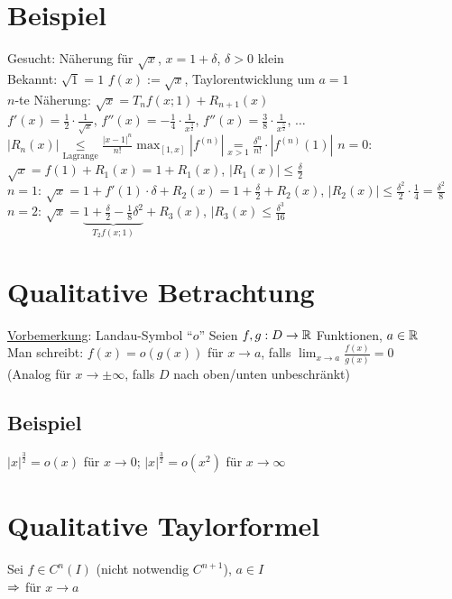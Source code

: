 \section{Beispiel}\label{15.4}
Gesucht: Näherung für $\sqrt{x}$, $x=1+\delta$, $\delta > 0$ klein\\
Bekannt: $\sqrt{1}=1$\nl
$f(x) := \sqrt{x}$, Taylorentwicklung um $a=1$\\
$n$-te Näherung: $\sqrt{x} = T_n f(x; 1) + R_{n+1}(x)$\\
$f'(x) = \frac{1}{2} \cdot \frac{1}{\sqrt{x}}$, $f''(x) = -\frac{1}{4} \cdot \frac{1}{x^{\frac{3}{2}}}$, $f''(x) = \frac{3}{8} \cdot \frac{1}{x^{\frac{5}{2}}}$, $\ldots$\nl
$|R_n(x)| \underset{\text{Lagrange}}{\le} \frac{|x-1|^n}{n!} \max_{[1,x]} |f^{(n)}| \underset{x>1}{=} \frac{\delta^n}{n!} \cdot |f^{(n)}(1)|$\nl
$n=0$: $\sqrt{x} = f(1)+R_1(x) = 1+R_1(x)$, $|R_1(x)| \le \frac{\delta}{2}$\\
$n=1$: $\sqrt{x} = 1+f'(1) \cdot \delta + R_2(x) = 1+\frac{\delta}{2} + R_2(x)$, $|R_2(x)| \le \frac{\delta^2}{2} \cdot \frac{1}{4} = \frac{\delta^2}{8}$\\
$n=2$: $\sqrt{x} = \underbrace{1+\frac{\delta}{2}-\frac{1}{8} \delta^2}_{T_2 f(x; 1)} + R_3(x)$, $|R_3(x) \le \frac{\delta^3}{16}$

\newpage

\section*{Qualitative Betrachtung}
\underline{Vorbemerkung}: Landau-Symbol "`$o$"'\nl
Seien $f,g: D \to \mathbb{R}$ Funktionen, $a \in \mathbb{R}$\\
Man schreibt: $f(x)=o(g(x))$ für $x \to a$, falls $\lim_{x \to a} \frac{f(x)}{g(x)} = 0$\\
(Analog für $x \to \pm \infty$, falls $D$ nach oben/unten unbeschränkt)

\subsection*{Beispiel}
$|x|^{\frac{3}{2}} = o(x)$ für $x \to 0$; $|x|^{\frac{3}{2}} = o(x^2)$ für $x \to \infty$

\section{Qualitative Taylorformel}\label{15.5}
Sei $f \in C^n(I)$ (nicht notwendig $C^{n+1}$), $a \in I$\\
$\Rightarrow$  für $x \to a$

